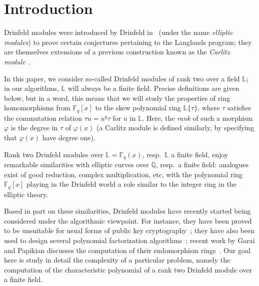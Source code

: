\documentclass[sigconf]{acmart}
\newcommand{\Q}{\mathbb{Q}}
\newcommand{\F}{\mathbb{F}}
\renewcommand{\L}{\mathbb{L}}
\newcommand{\ang}[1]{\{#1\}}
\begin{document}

\section{Introduction}

Drinfeld modules were introduced by Drinfeld in~\cite{Drinfeld74}
(under the name {\em elliptic modules}) to prove certain conjectures
pertaining to the Langlands program; they are themselves extensions of
a previous construction known as the {\em Carlitz
  module}~\cite{Carlitz35}.

In this paper, we consider so-called Drinfeld modules of rank two over
a field $\L$; in our algorithms, $\L$ will always be a finite
field. Precise definitions are given below, but in a word, this means
that we will study the properties of ring homomorphisms from $\F_q[x]$ to
the skew polynomial ring $\L\ang{\tau}$, where $\tau$ satisfies the
commutation relation $\tau u = u^q \tau$ for $u$ in $\L$. Here, the
{\em rank} of such a morphism $\varphi$ is the degree in $\tau$ of
$\varphi(x)$ (a Carlitz module is defined similarly, by specifying that
$\varphi(x)$ have degree one).

Rank two Drinfeld modules over $\L=\F_q(x)$, resp.\ $\L$ a finite
field, enjoy remarkable similarities with elliptic curves over $\Q$,
resp.\ a finite field: analogues exist of good reduction, complex
multiplication, etc, with the polynomial ring $\F_q[x]$ playing in the
Drinfeld world a role similar to the integer ring in the elliptic
theory.

Based in part on these similarities, Drinfeld modules have recently
started being considered under the algorithmic viewpoint. For
instance, they have been proved to be unsuitable for usual forms of
public key cryptography~\cite{Scanlon01}; they have also been used to
design several polynomial factorization
algorithms~\cite{PaPo89,vanderHeiden04,Narayanan18,eschost2017arXiv171200669D};
recent work by Garai and Papikian discusses the computation of their
endomorphism rings~\cite{GaPa18}. Our goal here is study in detail the
complexity of a particular problem, namely the computation of the
characteristic polynomial of a rank two Drinfeld module over a finite field.
\end{document}
